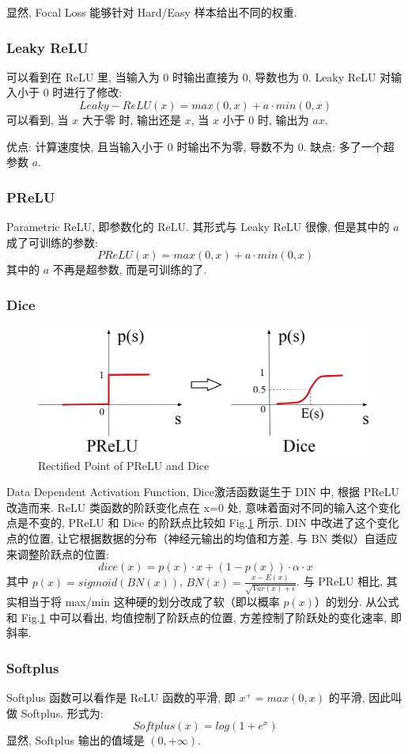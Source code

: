 显然, Focal Loss 能够针对 Hard/Easy 样本给出不同的权重. 

\subsubsection{Leaky ReLU}
可以看到在 ReLU 里, 当输入为 0 时输出直接为 0, 导数也为 0. Leaky ReLU 对输入小于 0 时进行了修改: 
$$
Leaky-ReLU(x) = max(0, x) + a \cdot min(0, x)
$$
可以看到, 当 $x$ 大于零 时, 输出还是 $x$, 当 $x$ 小于 0 时, 输出为 $a x$. 

优点: 计算速度快, 且当输入小于 0 时输出不为零, 导数不为 0. 缺点: 多了一个超参数 $a$. 

\subsubsection{PReLU}
Parametric ReLU, 即参数化的 ReLU. 其形式与 Leaky ReLU 很像, 但是其中的 $a$ 成了可训练的参数: 
$$
PReLU(x) = max(0, x) + a \cdot min(0, x)
$$
其中的 $a$ 不再是超参数, 而是可训练的了. 

\subsubsection{Dice}
\begin{figure}[h]
	\centering
	\includegraphics[width=.6\textwidth]{pics/prelu-dice.png}
	\caption{Rectified Point of PReLU and Dice}
	\label{fig:prelu_dice}
\end{figure}
Data Dependent Activation Function, Dice激活函数诞生于 DIN 中, 根据 PReLU 改造而来. ReLU 类函数的阶跃变化点在 x=0 处, 意味着面对不同的输入这个变化点是不变的, PReLU 和 Dice 的阶跃点比较如 Fig.\ref{fig:prelu_dice} 所示. DIN 中改进了这个变化点的位置, 让它根据数据的分布（神经元输出的均值和方差, 与 BN 类似）自适应来调整阶跃点的位置: 
$$
dice(x) = p(x) \cdot x + (1 - p(x)) \cdot \alpha \cdot x
$$
其中 $p(x) = sigmoid( BN(x))$, $BN(x) = \frac{x - E(x)}{\sqrt{Var(x) + \epsilon}}$. 与 PReLU 相比, 其实相当于将 max/min 这种硬的划分改成了软（即以概率 $p(x)$）的划分. 从公式和 Fig.\ref{fig:prelu_dice} 中可以看出, 均值控制了阶跃点的位置, 方差控制了阶跃处的变化速率, 即斜率. 

\subsubsection{Softplus}
Softplus 函数可以看作是 ReLU 函数的平滑, 即 $x^+ = max(0, x)$ 的平滑, 因此叫做 Softplus. 形式为: 
$$
Softplus(x) = log(1+e^x)
$$
显然, Softplus 输出的值域是 $(0, +\infty)$. 

